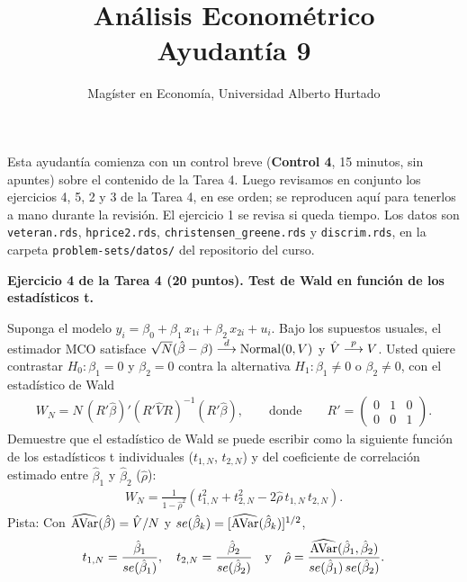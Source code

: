 \documentclass[letterpaper,11pt]{article}
\title{Análisis Econométrico \\ Ayudantía 9}
\author{Magíster en Economía, Universidad Alberto Hurtado}
\date{}
\begin{document}
\maketitle

\noindent Esta ayudantía comienza con un control breve (\textbf{Control 4}, 15 minutos, sin
apuntes) sobre el contenido de la Tarea 4. Luego revisamos en conjunto los ejercicios 4, 5, 2 y
3 de la Tarea 4, en ese orden; se reproducen aquí para tenerlos a mano durante la revisión. El
ejercicio 1 se revisa si queda tiempo. Los datos son \texttt{veteran.rds}, \texttt{hprice2.rds},
\texttt{christensen\_greene.rds} y \texttt{discrim.rds}, en la carpeta
\texttt{problem-sets/datos/} del repositorio del curso.

\vspace{1em}

\noindent\textbf{Ejercicio 4 de la Tarea 4 (20 puntos). Test de Wald en función de los estadísticos t.}

Suponga el modelo $y_i=\beta_0+\beta_1\,x_{1i}+\beta_2\,x_{2i}+u_i$. Bajo
los supuestos usuales, el estimador MCO satisface $\sqrt{N}(\hat \beta-\beta)\stackrel{d}{\longrightarrow}\operatorname{Normal}(0,V)$ y
$\hat V \stackrel{p}{\longrightarrow} V$. Usted quiere contrastar $H_0: \beta_1 = 0$ y $\beta_2 = 0$ contra la
alternativa $H_1: \beta_1 \neq 0$ o $\beta_2 \neq 0$, con el estad\'istico de Wald
\begin{align*}
W_N=N\,(R'\hat \beta)'(R'\hat V R)^{-1}(R'\hat \beta), \qquad \text{donde} \qquad
R'=\left(\begin{array}{ccc} 0 & 1 & 0\\ 0 & 0 & 1\end{array}\right).
\end{align*}
Demuestre que el estad\'istico de Wald se puede escribir como la siguiente funci\'on de los
estad\'isticos t individuales ($t_{1,N}$, $t_{2,N}$) y del coeficiente de correlaci\'on
estimado entre $\hat \beta_1$ y $\hat \beta_2$ ($\hat\rho$):
\begin{align*}
W_N = \frac{1}{1-\hat\rho^2}\left(t_{1,N}^2 + t_{2,N}^2-2 \hat \rho\, t_{1,N}\,t_{2,N}\right).
\end{align*}
Pista: Con $\widehat{\operatorname{AVar}}(\hat\beta)=\hat V/N$ y
$se(\hat\beta_k)=[\widehat{\operatorname{AVar}}(\hat\beta_k)]^{1/2}$,
\begin{align*}
t_{1,N} = \frac{\hat \beta_1}{se(\hat \beta_1)}, \quad
t_{2,N} = \frac{\hat \beta_2}{se(\hat \beta_2)} \quad \text{y} \quad
\hat \rho =\frac{ \widehat{\operatorname{AVar}}(\hat \beta_1,\hat \beta_2)}{ se(\hat \beta_1)\, se(\hat \beta_2)}.
\end{align*}
\end{document}
